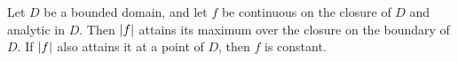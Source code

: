 \begin{theorem}\label{thm:maximum-modulus}
  Let $D$ be a bounded domain, and let $f$ be continuous on the closure of $D$
  and analytic in $D$. Then $\lvert f\rvert$ attains its maximum over the closure on
  the boundary of $D$. If $\lvert f\rvert$ also attains it at a point of $D$, then $f$
  is constant.
\end{theorem}
